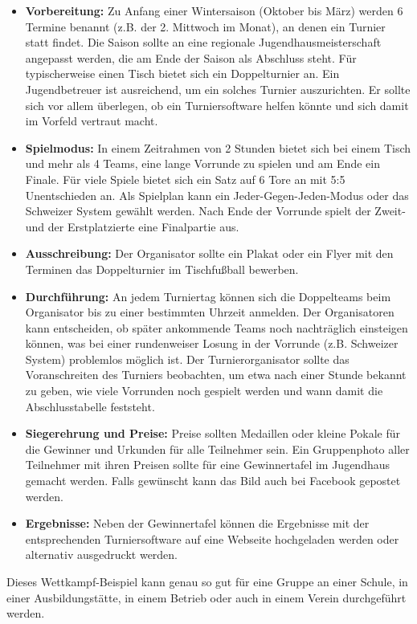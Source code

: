 \begin{itemize}
\item \textbf{Vorbereitung:} Zu Anfang einer Wintersaison (Oktober bis März) werden 6 Termine benannt (z.B. der 2. Mittwoch im Monat), an denen ein Turnier statt findet. Die Saison sollte an eine regionale Jugendhausmeisterschaft angepasst werden, die am Ende der Saison als Abschluss steht.   
Für typischerweise einen Tisch bietet sich ein Doppelturnier an. Ein Jugendbetreuer ist ausreichend, um ein solches Turnier auszurichten. Er sollte sich vor allem überlegen, ob ein Turniersoftware helfen könnte und sich damit im Vorfeld vertraut macht.  
\item \textbf{Spielmodus:} In einem Zeitrahmen von 2 Stunden bietet sich bei einem Tisch und mehr als 4 Teams, eine lange Vorrunde zu spielen und am Ende ein Finale. Für viele Spiele bietet sich ein Satz auf 6 Tore an mit 5:5 Unentschieden an. Als Spielplan kann ein Jeder-Gegen-Jeden-Modus oder das Schweizer System gewählt werden. Nach Ende der Vorrunde spielt der Zweit- und der Erstplatzierte eine Finalpartie aus.  
\item \textbf{Ausschreibung:} Der Organisator sollte ein Plakat oder ein Flyer mit den Terminen das Doppelturnier im Tischfußball bewerben. 
\item \textbf{Durchführung:} An jedem Turniertag können sich die Doppelteams beim Organisator bis zu einer bestimmten Uhrzeit anmelden. Der Organisatoren kann entscheiden, ob später ankommende Teams noch nachträglich einsteigen können, was bei einer rundenweiser Losung in der Vorrunde (z.B. Schweizer System) problemlos möglich ist. 
Der Turnierorganisator sollte das Voranschreiten des Turniers beobachten, um etwa nach einer Stunde bekannt zu geben, wie viele Vorrunden noch gespielt werden und wann damit die Abschlusstabelle feststeht. 
\item \textbf{Siegerehrung und Preise:} Preise sollten Medaillen oder kleine Pokale für die Gewinner und Urkunden für alle Teilnehmer sein. Ein Gruppenphoto aller Teilnehmer mit ihren Preisen sollte für eine Gewinnertafel im Jugendhaus gemacht werden. Falls gewünscht kann das Bild auch bei Facebook gepostet werden.
\item \textbf{Ergebnisse:} Neben der Gewinnertafel können die Ergebnisse mit der entsprechenden Turniersoftware auf eine Webseite hochgeladen werden oder alternativ ausgedruckt werden.
\end{itemize}

Dieses Wettkampf-Beispiel kann genau so gut für eine Gruppe an einer Schule, in einer Ausbildungstätte, in einem Betrieb oder auch in einem Verein durchgeführt werden.


